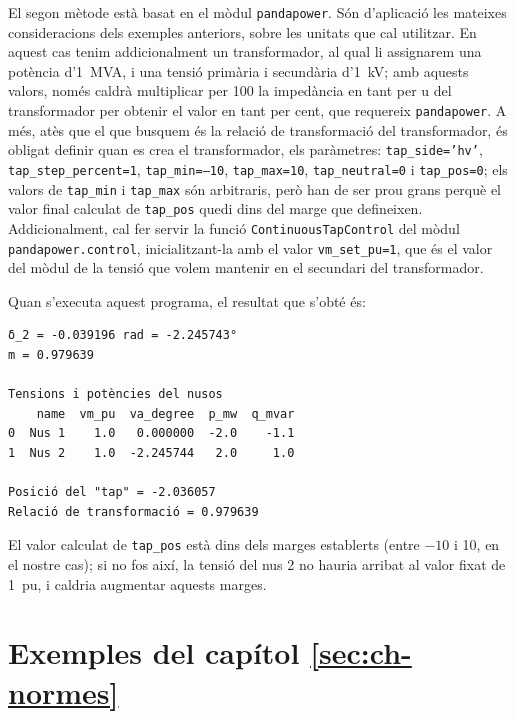 El segon mètode està basat en el mòdul \texttt{pandapower}. Són d'aplicació les mateixes consideracions dels exemples anteriors, sobre les unitats que cal utilitzar. En aquest cas tenim addicionalment un transformador, al qual li assignarem una potència d'\qty{1}{MVA}, i una tensió primària i secundària d'\qty{1}{kV}; amb aquests valors, només caldrà multiplicar per 100 la impedància en tant per u  del transformador per obtenir el valor en tant per cent, que requereix \texttt{pandapower}. A més, atès que el que busquem és la relació de transformació del transformador, és obligat definir quan es crea el transformador, els paràmetres: \texttt{tap\_side='hv'}, \texttt{tap\_step\_percent=1}, \texttt{tap\_min=--10}, \texttt{tap\_max=10}, \texttt{tap\_neutral=0} i  \texttt{tap\_pos=0}; els valors de \texttt{tap\_min} i \texttt{tap\_max} són arbitraris, però han de ser prou grans perquè el valor final calculat de \texttt{tap\_pos} quedi dins del marge que defineixen. Addicionalment, cal fer servir la funció \texttt{ContinuousTapControl} del mòdul \texttt{pandapower.control}, inicialitzant-la amb el valor \texttt{vm\_set\_pu=1}, que és el valor del mòdul de la tensió que volem mantenir en el secundari del transformador.




Quan s'executa aquest programa, el resultat que s'obté és:
\lstset{
	language=,
	numbers=none,
	frame=none
}
\begin{lstlisting}
δ_2 = -0.039196 rad = -2.245743°
m = 0.979639

Tensions i potències del nusos
    name  vm_pu  va_degree  p_mw  q_mvar
0  Nus 1    1.0   0.000000  -2.0    -1.1
1  Nus 2    1.0  -2.245744   2.0     1.0

Posició del "tap" = -2.036057
Relació de transformació = 0.979639
\end{lstlisting}

El valor calculat de \texttt{tap\_pos} està dins dels marges establerts (entre $-10$ i 10, en el nostre cas); si no fos així, la tensió del nus 2 no hauria arribat al valor fixat de \qty{1}{pu}, i caldria augmentar aquests marges.




\section{Exemples del capítol \ref*{sec:ch-normes}}

